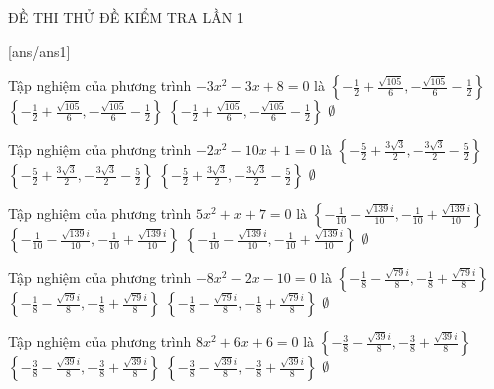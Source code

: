 \begin{name}
{ĐỀ THI THỬ}
{ĐỀ KIỂM TRA LẦN 1}
\end{name}
[ans/ans1]
\begin{ex}
Tập nghiệm của phương trình $- 3 x^{2} - 3 x + 8=0$ là
\choice
{$\left\{- \frac{1}{2} + \frac{\sqrt{105}}{6}, - \frac{\sqrt{105}}{6} - \frac{1}{2}\right\}$}
{$\left\{- \frac{1}{2} + \frac{\sqrt{105}}{6}, - \frac{\sqrt{105}}{6} - \frac{1}{2}\right\}$}
{$\left\{- \frac{1}{2} + \frac{\sqrt{105}}{6}, - \frac{\sqrt{105}}{6} - \frac{1}{2}\right\}$}
{$\emptyset$}
\end{ex}
\begin{ex}
Tập nghiệm của phương trình $- 2 x^{2} - 10 x + 1=0$ là
\choice
{$\left\{- \frac{5}{2} + \frac{3 \sqrt{3}}{2}, - \frac{3 \sqrt{3}}{2} - \frac{5}{2}\right\}$}
{$\left\{- \frac{5}{2} + \frac{3 \sqrt{3}}{2}, - \frac{3 \sqrt{3}}{2} - \frac{5}{2}\right\}$}
{$\left\{- \frac{5}{2} + \frac{3 \sqrt{3}}{2}, - \frac{3 \sqrt{3}}{2} - \frac{5}{2}\right\}$}
{$\emptyset$}
\end{ex}
\begin{ex}
Tập nghiệm của phương trình $5 x^{2} + x + 7=0$ là
\choice
{$\left\{- \frac{1}{10} - \frac{\sqrt{139} i}{10}, - \frac{1}{10} + \frac{\sqrt{139} i}{10}\right\}$}
{$\left\{- \frac{1}{10} - \frac{\sqrt{139} i}{10}, - \frac{1}{10} + \frac{\sqrt{139} i}{10}\right\}$}
{$\left\{- \frac{1}{10} - \frac{\sqrt{139} i}{10}, - \frac{1}{10} + \frac{\sqrt{139} i}{10}\right\}$}
{$\emptyset$}
\end{ex}
\begin{ex}
Tập nghiệm của phương trình $- 8 x^{2} - 2 x - 10=0$ là
\choice
{$\left\{- \frac{1}{8} - \frac{\sqrt{79} i}{8}, - \frac{1}{8} + \frac{\sqrt{79} i}{8}\right\}$}
{$\left\{- \frac{1}{8} - \frac{\sqrt{79} i}{8}, - \frac{1}{8} + \frac{\sqrt{79} i}{8}\right\}$}
{$\left\{- \frac{1}{8} - \frac{\sqrt{79} i}{8}, - \frac{1}{8} + \frac{\sqrt{79} i}{8}\right\}$}
{$\emptyset$}
\end{ex}
\begin{ex}
Tập nghiệm của phương trình $8 x^{2} + 6 x + 6=0$ là
\choice
{$\left\{- \frac{3}{8} - \frac{\sqrt{39} i}{8}, - \frac{3}{8} + \frac{\sqrt{39} i}{8}\right\}$}
{$\left\{- \frac{3}{8} - \frac{\sqrt{39} i}{8}, - \frac{3}{8} + \frac{\sqrt{39} i}{8}\right\}$}
{$\left\{- \frac{3}{8} - \frac{\sqrt{39} i}{8}, - \frac{3}{8} + \frac{\sqrt{39} i}{8}\right\}$}
{$\emptyset$}
\end{ex}
